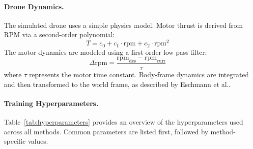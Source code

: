 \paragraph{Drone Dynamics.}
The simulated drone uses a simple physics model. Motor thrust is derived from RPM via a second-order polynomial:
\[
T = c_0 + c_1 \cdot \text{rpm} + c_2 \cdot \text{rpm}^2
\]
The motor dynamics are modeled using a first-order low-pass filter:
\[
\Delta \text{rpm} = \frac{\text{rpm}_{\text{des}} - \text{rpm}_{\text{curr}}}{\tau}
\]
where \( \tau \) represents the motor time constant. Body-frame dynamics are integrated and then transformed to the world frame, as described by Eschmann et al.\cite{Eschmann2023}.

\paragraph{Training Hyperparameters.}
Table~\ref{tab:hyperparameters} provides an overview of the hyperparameters used across all methods. Common parameters are listed first, followed by method-specific values.

